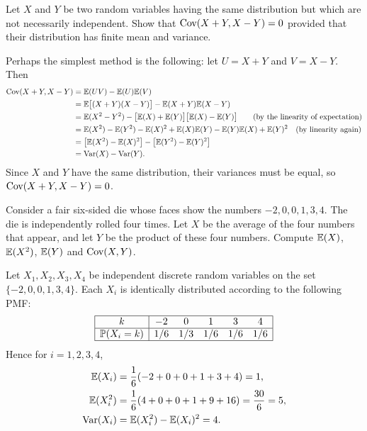 \begin{exercise}
\begin{questions}
\question
Let $X$ and $Y$ be two random variables having the same distribution but which are not necessarily independent. Show that
$
\text{Cov}(X+Y,X-Y)=0
$
provided that their distribution has finite mean and variance.

\begin{answer}
Perhaps the simplest method is the following: let $U=X+Y$ and $V=X-Y$. Then 
\begin{align*}
\text{Cov}(X+Y,X-Y) 
	& = \mathbb{E}(UV) - \mathbb{E}(U)\mathbb{E}(V) \\
	& = \mathbb{E}\big[(X+Y)(X-Y)\big] - \mathbb{E}(X+Y)\mathbb{E}(X-Y) \\
	& = \mathbb{E}(X^2 - Y^2) - \big[\mathbb{E}(X)+\mathbb{E}(Y)\big]\big[\mathbb{E}(X)-\mathbb{E}(Y)\big]	\qquad\text{(by the linearity of expectation)} \\
	& = \mathbb{E}(X^2) - \mathbb{E}(Y^2) - \mathbb{E}(X)^2 +\mathbb{E}(X)\mathbb{E}(Y) - \mathbb{E}(Y)\mathbb{E}(X) + \mathbb{E}(Y)^2 \quad\text{(by linearity again)} \\
	& = \big[\mathbb{E}(X^2) - \mathbb{E}(X)^2\big] - \big[\mathbb{E}(Y^2) - \mathbb{E}(Y)^2\big] \\
	& = \text{Var}(X) - \text{Var}(Y).
\end{align*}
Since $X$ and $Y$ have the same distribution, their variances must be equal, so $\text{Cov}(X+Y,X-Y)=0$.
\end{answer}



\question
Consider a fair six-sided die whose faces show the numbers $-2,0,0,1,3,4$. The die is independently rolled four times. Let $X$ be the average of the four numbers that appear, and let $Y$ be the product of these four numbers. Compute $\mathbb{E}(X)$, $\mathbb{E}(X^2)$, $\mathbb{E}(Y)$ and $\text{Cov}(X,Y)$.
\begin{answer}
Let $X_1,X_2,X_3,X_4$ be independent discrete random variables on the set $\{-2,0,0,1,3,4\}$. Each $X_i$ is identically distributed according to the following PMF:
\[\begin{array}{|c|ccccc|}\hline
k			& -2		& 0		& 1		& 3		& 4 	\\ \hline
\mathbb{P}(X_i=k)		& 1/6	& 1/3	& 1/6	& 1/6 	& 1/6	\\ \hline
\end{array}\]
Hence for $i=1,2,3,4$,
\begin{align*}
\mathbb{E}(X_i)		& = \frac{1}{6}(-2+0+0+1+3+4) = 1, \\
\mathbb{E}(X_i^2)	& = \frac{1}{6}(4+0+0+1+9+16) = \frac{30}{6} = 5, \\
\text{Var}(X_i)		& = \mathbb{E}(X_i^2)-\mathbb{E}(X_i)^2 = 4.
\end{align*}


\end{answer}
\end{questions}
\end{exercise}
